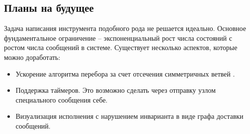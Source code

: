 \subsection{Планы на будущее}

Задача написания инструмента подобного рода не решается идеально. Основное фундаментальное ограничение – экспоненциальный рост числа состояний с ростом числа сообщений в системе. Существует несколько аспектов, которые можно доработать:

\begin{itemize}
    \item Ускорение алгоритма перебора за счет отсечения симметричных ветвей \cite{dpor}.
    \item Поддержка таймеров. Это возможно сделать через отправку узлом специального сообщения себе.
    \item Визуализация исполнения с нарушением инварианта в виде графа доставки сообщений.
\end{itemize}
